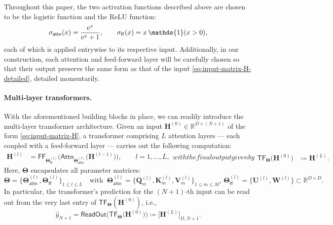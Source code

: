 \documentclass[english]{article}
\DeclareMathOperator{\ind}{\mathds{1}}  %
\newcommand{\Att}{\mathsf{Attn}}
\newcommand{\att}{\mathsf{attn}}
\newcommand{\ff}{\mathsf{ff}}
\newcommand{\MLP}{\mathsf{FF}}
\newcommand{\mlp}{\mathsf{ff}}
\newcommand{\TF}{\mathsf{TF}}
\begin{document}
\noindent 
Throughout this paper, the two activation functions described above are chosen to be the logistic function and the ReLU function: 
%
\begin{align}
\sigma_{\att}(x) = \frac{{\rm e}^x}{{\rm e}^{x}+1},\qquad \sigma_{\ff}(x) = x\ind(x>0),
\label{eq:sigma-attn-ff-choice}
\end{align}
%
each of which is applied entrywise to its respective input. 
Additionally, in our construction, each attention and feed-forward layer will be carefully chosen so that their output preserve the same form as that of the input \eqref{eq:input-matrix-H-detailed}, detailed momentarily. 






\paragraph{Multi-layer transformers.} 
With the aforementioned building blocks in place, we can readily introduce the multi-layer transformer architecture. 
%
Given an input $\bm{H}^{(0)}\in \mathbb{R}^{D\times (N+1)}$ of the form \eqref{eq:input-matrix-H}, a transformer comprising $L$ attention layers --- each coupled with a feed-forward layer --- carries out the following computation:
%
\begin{subequations}
%
\label{eq:transformer-structure-defn}
%
\begin{align}
\bm{H}^{(l)} & =\MLP_{\bm{\Theta}_{\mlp}^{(l)}}\Big(\Att_{\bm{\Theta}_{\att}^{(l)}}\big(\bm{H}^{(l-1)}\big)\Big), \qquad l = 1, \dots, L,
\end{align}
%
with the final output given by
%
\begin{align}
 \TF_{\bm{\Theta}}\big(\bm{H}^{(0)}\big) & \coloneqq \bm{H}^{(L)}.
 \end{align}
 \end{subequations}
%
Here,  $\bm{\Theta}$ encapsulates all parameter matrices:
%
$$
    \bm{\Theta}= \big\{ \bm{\Theta}^{(l)}_{\att}, \bm{\Theta}^{(l)}_{\mlp} \big\}_{1\leq l\leq L} 
    \quad \text{with }~\bm{\Theta}^{(l)}_{\att}= \big\{\bm{Q}_m^{(l)}, \bm{K}_m^{(l)}, \bm{V}_m^{(l)} \big\}_{1\leq m\leq M} ,\, \bm{\Theta}^{(l)}_{\mlp}= \big\{\bm{U}^{(l)}, \bm{W}^{(l)} \big\}\subset \mathbb{R}^{D\times D}.
$$
%
In particular, the transformer's prediction for the $(N+1)$-th input can be read out from  the very last entry of $\TF_{\bm{\Theta}}(\bm{H}^{(0)})$, i.e.,
%
\begin{equation}
    \widehat{y}_{N+1} = \mathsf{ReadOut}\big(\TF_{\bm{\Theta}}\big(\bm{H}^{(0)}\big)\big) \coloneqq 
    \big[ \bm{H}^{(L)}\big]_{D,N+1}. 
    \label{eq:y-hat-N-plus-1-readout}
\end{equation}
\end{document}

